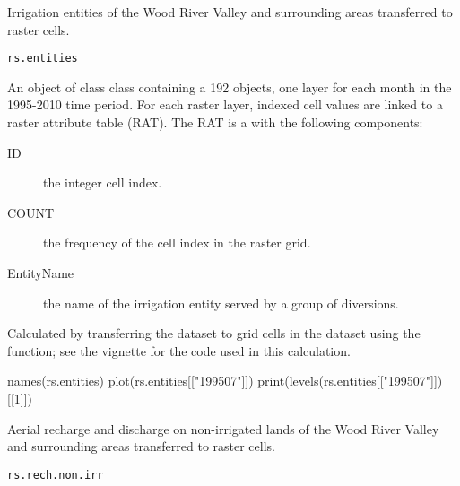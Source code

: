 \documentclass[letterpaper]{book}
\begin{document}
%
\begin{Description}\relax
Irrigation entities of the Wood River Valley and surrounding areas transferred to raster cells.
\end{Description}
%
\begin{Usage}
\begin{verbatim}
rs.entities
\end{verbatim}
\end{Usage}
%
\begin{Format}
An object of class  class containing a 192  objects, one layer for each month in the 1995-2010 time period.
For each raster layer, indexed cell values are linked to a raster attribute table (RAT).
The RAT is a  with the following components:
\begin{description}

\item[ID] the integer cell index.
\item[COUNT] the frequency of the cell index in the raster grid.
\item[EntityName] the name of the irrigation entity served by a group of diversions.

\end{description}

\end{Format}
%
\begin{Source}\relax
Calculated by transferring the  dataset to grid cells in the  dataset using the  function;
see the  vignette for the \R{} code used in this calculation.
\end{Source}
%
\begin{Examples}
\begin{ExampleCode}
names(rs.entities)
plot(rs.entities[["199507"]])
print(levels(rs.entities[["199507"]])[[1]])
\end{ExampleCode}
\end{Examples}
%
\begin{Description}\relax
Aerial recharge and discharge on non-irrigated lands of the Wood River Valley and surrounding areas transferred to raster cells.
\end{Description}
%
\begin{Usage}
\begin{verbatim}
rs.rech.non.irr
\end{verbatim}
\end{Usage}
\end{document}
